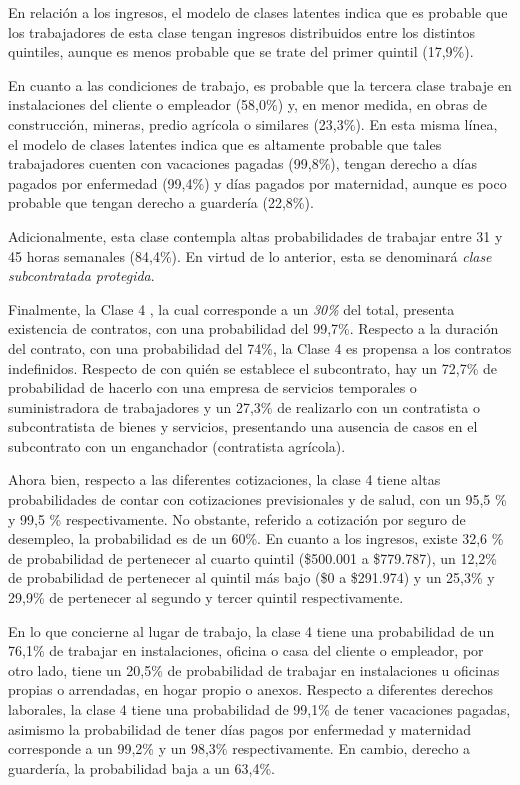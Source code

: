 \documentclass[
]{article}
\begin{document}
En relación a los ingresos, el modelo de clases latentes indica que es
probable que los trabajadores de esta clase tengan ingresos distribuidos
entre los distintos quintiles, aunque es menos probable que se trate del
primer quintil (17,9\%).

En cuanto a las condiciones de trabajo, es probable que la tercera clase
trabaje en instalaciones del cliente o empleador (58,0\%) y, en menor
medida, en obras de construcción, mineras, predio agrícola o similares
(23,3\%). En esta misma línea, el modelo de clases latentes indica que
es altamente probable que tales trabajadores cuenten con vacaciones
pagadas (99,8\%), tengan derecho a días pagados por enfermedad (99,4\%)
y días pagados por maternidad, aunque es poco probable que tengan
derecho a guardería (22,8\%).

Adicionalmente, esta clase contempla altas probabilidades de trabajar
entre 31 y 45 horas semanales (84,4\%). En virtud de lo anterior, esta
se denominará \emph{clase subcontratada protegida}.

Finalmente, la Clase 4 , la cual corresponde a un \emph{30\%} del total,
presenta existencia de contratos, con una probabilidad del 99,7\%.
Respecto a la duración del contrato, con una probabilidad del 74\%, la
Clase 4 es propensa a los contratos indefinidos. Respecto de con quién
se establece el subcontrato, hay un 72,7\% de probabilidad de hacerlo
con una empresa de servicios temporales o suministradora de trabajadores
y un 27,3\% de realizarlo con un contratista o subcontratista de bienes
y servicios, presentando una ausencia de casos en el subcontrato con un
enganchador (contratista agrícola).

Ahora bien, respecto a las diferentes cotizaciones, la clase 4 tiene
altas probabilidades de contar con cotizaciones previsionales y de
salud, con un 95,5 \% y 99,5 \% respectivamente. No obstante, referido a
cotización por seguro de desempleo, la probabilidad es de un 60\%. En
cuanto a los ingresos, existe 32,6 \% de probabilidad de pertenecer al
cuarto quintil (\$500.001 a \$779.787), un 12,2\% de probabilidad de
pertenecer al quintil más bajo (\$0 a \$291.974) y un 25,3\% y 29,9\% de
pertenecer al segundo y tercer quintil respectivamente.

En lo que concierne al lugar de trabajo, la clase 4 tiene una
probabilidad de un 76,1\% de trabajar en instalaciones, oficina o casa
del cliente o empleador, por otro lado, tiene un 20,5\% de probabilidad
de trabajar en instalaciones u oficinas propias o arrendadas, en hogar
propio o anexos. Respecto a diferentes derechos laborales, la clase 4
tiene una probabilidad de 99,1\% de tener vacaciones pagadas, asimismo
la probabilidad de tener días pagos por enfermedad y maternidad
corresponde a un 99,2\% y un 98,3\% respectivamente. En cambio, derecho
a guardería, la probabilidad baja a un 63,4\%.
\end{document}
